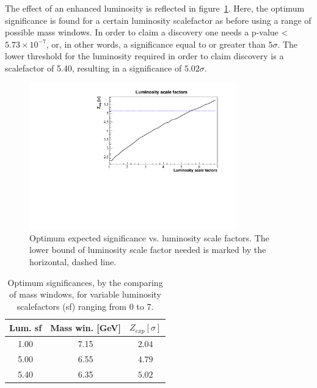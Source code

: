 \documentclass[12pt,a4paper]{amsart}
\begin{document}
The effect of an enhanced luminosity is reflected in figure~\ref{fig:significance_vs_lumScaleFactors}. Here, the optimum significance is found for a certain luminosity scalefactor as before using a range of possible mass windows. In order to claim a discovery one needs a p-value < $5.73\times 10^{-7}$, or, in other words, a significance equal to or greater than $5\sigma$. The lower threshold for the luminosity required in order to claim discovery is a scalefactor of 5.40, resulting in a significance of $5.02\sigma$.

\begin{figure}
\centering
\includegraphics[width=0.8\textwidth]{../data/11_1/Luminosity_scalefactors_vs_optimum_significance.pdf}
\caption{Optimum expected significance vs. luminosity scale factors. The lower bound of luminosity scale factor needed is marked by the horizontal, dashed line.}
\label{fig:significance_vs_lumScaleFactors}
\end{figure}

\begin{table}[]
\caption{Optimum significances, by the comparing of mass windows, for variable luminosity scalefactors (sf) ranging from 0 to 7.}
\label{tab:Significance_vs_lumScaleFactors}
\begin{tabular}{c|cc}
\hline\hline
Lum. sf & Mass win. [GeV] & $Z_{exp} [\sigma]$ \\ \hline
1.00             &7.15      & $2.04$  \\
5.00             & 6.55      & $4.79$ \\
5.40             & 6.35      & $5.02$ \\ \hline\hline
\end{tabular}
\end{table}
\end{document}
